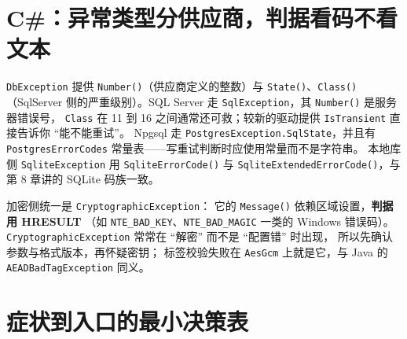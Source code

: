 \documentclass[12pt,a4paper,fontset=fandol]{ctexbook}
\newcommand{\Fn}[1]{\texttt{#1()}}
\newcommand{\Tp}[1]{\texttt{#1}}
\newcommand{\CSharp}{C\#}
\begin{document}
\section{\CSharp{}：异常类型分供应商，判据看码不看文本}

\Tp{DbException} 提供 \Fn{Number}（供应商定义的整数）与
\Fn{State}、\Fn{Class}（SqlServer 侧的严重级别）。SQL Server 走
\Tp{SqlException}，其 \Fn{Number} 是服务器错误号，
\Tp{Class} 在 11 到 16 之间通常还可救；较新的驱动提供
\Tp{IsTransient} 直接告诉你 ``能不能重试''。
Npgsql 走 \Tp{PostgresException.SqlState}，并且有
\Tp{PostgresErrorCodes} 常量表——写重试判断时应使用常量而不是字符串。
本地库侧 \Tp{SqliteException} 用 \Fn{SqliteErrorCode} 与
\Fn{SqliteExtendedErrorCode}，与第 8 章讲的 SQLite 码族一致。

加密侧统一是 \Tp{Cryptographic\allowbreak{}Exception}：
它的 \Fn{Message} 依赖区域设置，\textbf{判据用 HRESULT}
（如 \Tp{NTE\_\allowbreak{}BAD\_\allowbreak{}KEY}、\Tp{NTE\_\allowbreak{}BAD\_\allowbreak{}MAGIC} 一类的 Windows 错误码）。
\Tp{Cryptographic\allowbreak{}Exception} 常常在 ``解密'' 而不是 ``配置错'' 时出现，
所以先确认参数与格式版本，再怀疑密钥；
标签校验失败在 \Tp{AesGcm} 上就是它，与 Java 的
\Tp{AEADBad\allowbreak{}Tag\allowbreak{}Exception} 同义。

\section{症状到入口的最小决策表}
\end{document}
